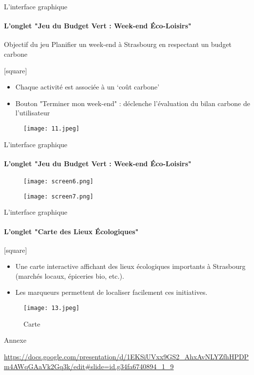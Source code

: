 \documentclass{beamer}
\begin{document}
\begin{frame}{L'interface graphique}
\framesubtitle{L'onglet "Jeu du Budget Vert : Week-end Éco-Loisirs"}

\begin{block}{Objectif du jeu}
Planifier un week-end à Strasbourg en respectant un budget carbone
\end{block}
[square]

\begin{itemize}
    \item Chaque activité est  associée à un ‘coût carbone’
    \item Bouton "Terminer mon week-end" : déclenche l'évaluation du bilan carbone de l'utilisateur
\end{itemize}


\begin{figure}
    \centering
    \texttt{[image: 11.jpeg]}
    \label{fig:enter-label}
\end{figure}

    
\end{frame}

\begin{frame}{L'interface graphique}
\framesubtitle{L'onglet "Jeu du Budget Vert : Week-end Éco-Loisirs"}


\begin{figure}[ht]
    \centering
    \begin{minipage}{0.45\linewidth}
        \centering
        \texttt{[image: screen6.png]}
        \label{fig:image1}
    \end{minipage}
    \hfill
    \begin{minipage}{0.45\linewidth}
        \centering
        \texttt{[image: screen7.png]}
        \label{fig:image2}
    \end{minipage}
\end{figure}

\end{frame}

\begin{frame}{L'interface graphique}
\framesubtitle{L'onglet "Carte des Lieux Écologiques"}
[square]

\begin{itemize}
    \item Une carte interactive affichant des lieux écologiques importants à Strasbourg (marchés locaux, épiceries bio, etc.).
    \item Les marqueurs permettent de localiser facilement ces initiatives.
\end{itemize}

\begin{figure}
    \centering
    \texttt{[image: 13.jpeg]}
    \caption{Carte}
    \label{fig:enter-label}
\end{figure}

\end{frame}

\begin{frame}{Annexe}

\url{https://docs.google.com/presentation/d/1EKSiUVxx9GS2_AhxAvNLYZfhHPDPm4AWqGAaVk2Gq3k/edit#slide=id.g34fa6740894_1_9}
    
\end{frame}
\end{document}
